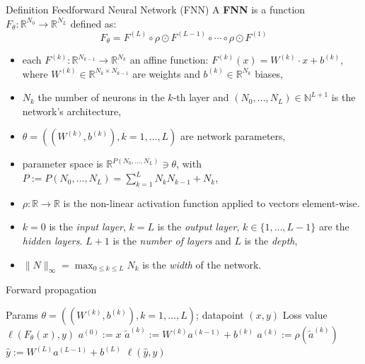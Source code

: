 \documentclass[a4paper,10pt]{article}
\newenvironment{myitemize}
{\vspace{-0.25cm}\begin{itemize}}
{\end{itemize}}
\begin{document}
\begin{small}
\begin{subbox}{Definition Feedforward Neural Network (FNN)}
    A \textbf{FNN} is a function $F_{\theta}: \mathbb{R}^{N_0} \rightarrow \mathbb{R}^{N_L}$ defined as:
$$
F_{\theta} = F^{(L)} \circ \rho \odot F^{(L-1)} \circ \cdots \circ \rho \odot F^{(1)}
$$
\vspace{-0.5cm}
\begin{myitemize}
    \item each $F^{(k)}: \mathbb{R}^{N_{k-1}} \rightarrow \mathbb{R}^{N_k}$ an affine function: $ F^{(k)}(x) = W^{(k)} \cdot x + b^{(k)} $, where $W^{(k)} \in \mathbb{R}^{N_k \times N_{k-1}}$ are weights and $b^{(k)} \in \mathbb{R}^{N_k}$ biases,
    \item $N_k$ the number of neurons in the $k$-th layer and $(N_0, \dots, N_L) \in \mathbb{N}^{L+1}$ is the network's architecture,
    \item $\theta = ((W^{(k)}, b^{(k)}), k = 1, \dots, L)$ are network parameters,
    \item parameter space is $\mathbb{R}^{P(N_0,\dots,N_L)} \ni \theta$, with $P := P(N_0, \dots, N_L) = \sum_{k=1}^{L} N_k N_{k-1} + N_k$,
    \item $\rho: \mathbb{R} \rightarrow \mathbb{R}$ is the non-linear activation function applied to vectors element-wise.
\end{myitemize}
\end{subbox}

\begin{myitemize}
    \item $k = 0$ is the \textit{input layer}, $k = L$ is the \textit{output layer}, $k \in \{1, \dots, L-1\}$ are the \textit{hidden layers}. $L + 1$ is the \textit{number of layers} and $L$ is the \textit{depth},
    \item $\|N\|_{\infty} = \max_{0 \leq k \leq L} N_k$ is the \textit{width} of the network.
\end{myitemize}

\vspace{-0.3cm}
\begin{algorithm}
\footnotesize
\caption{Forward propagation}
\begin{algorithmic}[1]
\Require Params $\theta = \left( \left(W^{(k)}, b^{(k)}\right), k = 1, \dots, L \right)$; datapoint $(x, y)$
\Ensure Loss value $\ell(F_{\theta}(x), y)$
\State $a^{(0)} := x$
    \State $\tilde{a}^{(k)} := W^{(k)} a^{(k-1)} + b^{(k)}$
    \State $a^{(k)} := \rho(\tilde{a}^{(k)})$
\EndFor
\State $\hat{y} := W^{(L)} a^{(L-1)} + b^{(L)}$
\State \Return $\ell(\hat{y}, y)$
\end{algorithmic}
\end{algorithm}
\vspace{-0.5cm}


\end{small}
\end{document}
